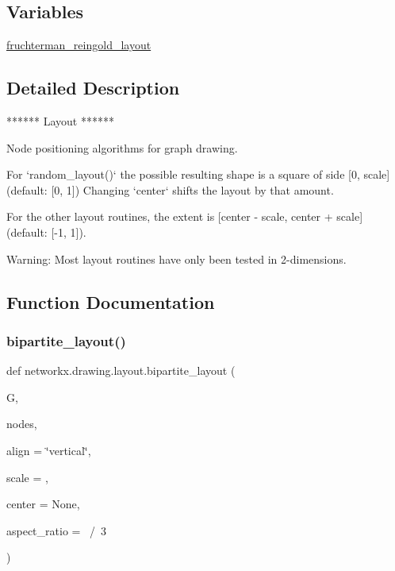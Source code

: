 \subsection*{Variables}
\begin{DoxyCompactItemize}
\item 
\hyperlink{namespacenetworkx_1_1drawing_1_1layout_a0778ce3d6875858bcd5f59b42f87ebff}{fruchterman\+\_\+reingold\+\_\+layout}
\end{DoxyCompactItemize}


\subsection{Detailed Description}
\begin{DoxyVerb}******
Layout
******

Node positioning algorithms for graph drawing.

For `random_layout()` the possible resulting shape
is a square of side [0, scale] (default: [0, 1])
Changing `center` shifts the layout by that amount.

For the other layout routines, the extent is
[center - scale, center + scale] (default: [-1, 1]).

Warning: Most layout routines have only been tested in 2-dimensions.\end{DoxyVerb}
 

\subsection{Function Documentation}
\mbox{\label{namespacenetworkx_1_1drawing_1_1layout_a333ec4bb45a6a3490bcd462b06ff025a}} 
\subsubsection{\texorpdfstring{bipartite\+\_\+layout()}{bipartite\_layout()}}
{\footnotesize\ttfamily def networkx.\+drawing.\+layout.\+bipartite\+\_\+layout (\begin{DoxyParamCaption}\item[{}]{G,  }\item[{}]{nodes,  }\item[{}]{align = {\ttfamily \char`\"{}vertical\char`\"{}},  }\item[{}]{scale = {},  }\item[{}]{center = {\ttfamily None},  }\item[{}]{aspect\+\_\+ratio = {~/~3} }\end{DoxyParamCaption})}

